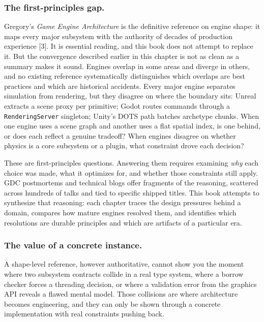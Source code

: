 \documentclass[
  11pt,
  letterpaper,
  DIV=11,
  numbers=noendperiod,
  twoside,
  open=right]{scrreprt}
\begin{document}
\subsubsection*{The first-principles
gap.}\label{the-first-principles-gap.}

Gregory's \emph{Game Engine Architecture} is the definitive reference on
engine shape: it maps every major subsystem with the authority of
decades of production experience {[}3{]}. It is essential reading, and
this book does not attempt to replace it. But the convergence described
earlier in this chapter is not as clean as a summary makes it sound.
Engines overlap in some areas and diverge in others, and no existing
reference systematically distinguishes which overlaps are best practices
and which are historical accidents. Every major engine separates
simulation from rendering, but they disagree on where the boundary sits:
Unreal extracts a scene proxy per primitive; Godot routes commands
through a \texttt{RenderingServer} singleton; Unity's DOTS path batches
archetype chunks. When one engine uses a scene graph and another uses a
flat spatial index, is one behind, or does each reflect a genuine
tradeoff? When engines disagree on whether physics is a core subsystem
or a plugin, what constraint drove each decision?

These are first-principles questions. Answering them requires examining
\emph{why} each choice was made, what it optimizes for, and whether
those constraints still apply. GDC postmortems and technical blogs offer
fragments of the reasoning, scattered across hundreds of talks and tied
to specific shipped titles. This book attempts to synthesize that
reasoning: each chapter traces the design pressures behind a domain,
compares how mature engines resolved them, and identifies which
resolutions are durable principles and which are artifacts of a
particular era.

\subsubsection*{The value of a concrete
instance.}\label{the-value-of-a-concrete-instance.}

A shape-level reference, however authoritative, cannot show you the
moment where two subsystem contracts collide in a real type system,
where a borrow checker forces a threading decision, or where a
validation error from the graphics API reveals a flawed mental model.
Those collisions are where architecture becomes engineering, and they
can only be shown through a concrete implementation with real
constraints pushing back.
\end{document}
